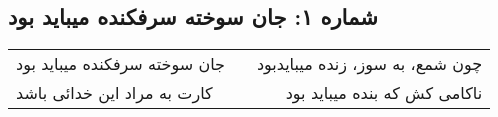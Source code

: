 \begin{center}
\section*{شماره ۱: جان سوخته سرفکنده میباید بود}
\label{sec:001}
\begin{longtable}{l p{0.5cm} r}
جان سوخته سرفکنده میباید بود
&&
چون شمع، به سوز، زنده میبایدبود
\\
کارت به مراد این خدائی باشد
&&
ناکامی کش که بنده میباید بود
\\
\end{longtable}
\end{center}

